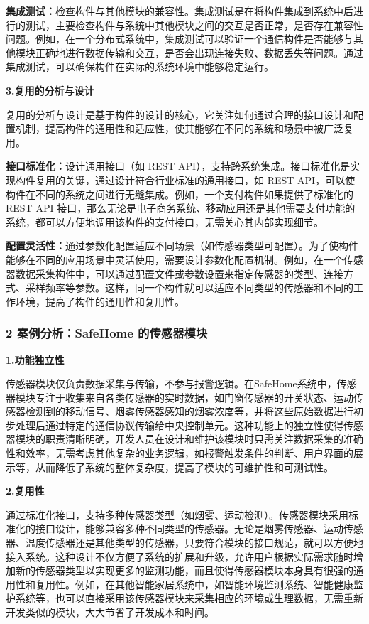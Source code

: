 \textbf{集成测试：}检查构件与其他模块的兼容性。集成测试是在将构件集成到系统中后进行的测试，主要检查构件与系统中其他模块之间的交互是否正常，是否存在兼容性问题。例如，在一个分布式系统中，集成测试可以验证一个通信构件是否能够与其他模块正确地进行数据传输和交互，是否会出现连接失败、数据丢失等问题。通过集成测试，可以确保构件在实际的系统环境中能够稳定运行。

\textbf{3.复用的分析与设计}

复用的分析与设计是基于构件的设计的核心，它关注如何通过合理的接口设计和配置机制，提高构件的通用性和适应性，使其能够在不同的系统和场景中被广泛复用。

\textbf{接口标准化：}设计通用接口（如 REST API），支持跨系统集成。接口标准化是实现构件复用的关键，通过设计符合行业标准的通用接口，如 REST API，可以使构件在不同的系统之间进行无缝集成。例如，一个支付构件如果提供了标准化的 REST API 接口，那么无论是电子商务系统、移动应用还是其他需要支付功能的系统，都可以方便地调用该构件的支付接口，无需关心其内部实现细节。

\textbf{配置灵活性：}通过参数化配置适应不同场景（如传感器类型可配置）。为了使构件能够在不同的应用场景中灵活使用，需要设计参数化配置机制。例如，在一个传感器数据采集构件中，可以通过配置文件或参数设置来指定传感器的类型、连接方式、采样频率等参数。这样，同一个构件就可以适应不同类型的传感器和不同的工作环境，提高了构件的通用性和复用性。

\subsubsection{2 案例分析：SafeHome 的传感器模块}\label{ux6848ux4f8bux5206ux6790safehome-ux7684ux4f20ux611fux5668ux6a21ux5757}

\textbf{1.功能独立性}

传感器模块仅负责数据采集与传输，不参与报警逻辑。在SafeHome系统中，传感器模块专注于收集来自各类传感器的实时数据，如门窗传感器的开关状态、运动传感器检测到的移动信号、烟雾传感器感知的烟雾浓度等，并将这些原始数据进行初步处理后通过特定的通信协议传输给中央控制单元。这种功能上的独立性使得传感器模块的职责清晰明确，开发人员在设计和维护该模块时只需关注数据采集的准确性和效率，无需考虑其他复杂的业务逻辑，如报警触发条件的判断、用户界面的展示等，从而降低了系统的整体复杂度，提高了模块的可维护性和可测试性。

\textbf{2.复用性}

通过标准化接口，支持多种传感器类型（如烟雾、运动检测）。传感器模块采用标准化的接口设计，能够兼容多种不同类型的传感器。无论是烟雾传感器、运动传感器、温度传感器还是其他类型的传感器，只要符合模块的接口规范，就可以方便地接入系统。这种设计不仅方便了系统的扩展和升级，允许用户根据实际需求随时增加新的传感器类型以实现更多的监测功能，而且使得传感器模块本身具有很强的通用性和复用性。例如，在其他智能家居系统中，如智能环境监测系统、智能健康监护系统等，也可以直接采用该传感器模块来采集相应的环境或生理数据，无需重新开发类似的模块，大大节省了开发成本和时间。

